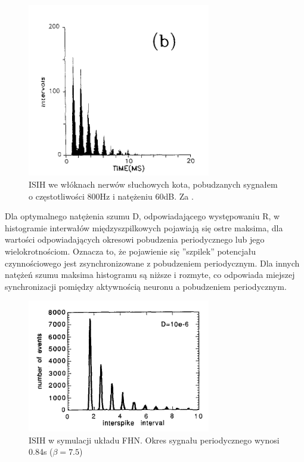   \begin{figure}
    \includegraphics[width=80mm]{images/longtin_fig1b.png}
    \caption{ISIH we włóknach nerwów słuchowych kota, pobudzanych sygnałem o częstotliwości 800Hz i natężeniu 60dB. Za \cite{longtin}.}
    \label{fig:graphics:longtin1b}
  \end{figure}

  Dla optymalnego natężenia szumu D, odpowiadającego występowaniu R, w histogramie interwałów międzyszpilkowych pojawiają się ostre maksima, dla wartości odpowiadających okresowi pobudzenia periodycznego lub jego wielokrotnościom. Oznacza to, że pojawienie się ''szpilek'' potencjału czynnościowego jest zsynchronizowane z pobudzeniem periodycznym. Dla innych natężeń szumu maksima histogramu są niższe i rozmyte, co odpowiada miejszej synchronizacji pomiędzy aktywnością neuronu a pobudzeniem periodycznym.


  \begin{figure}
    \includegraphics[width=80mm]{images/longtin_fig5a.png}
    \caption{ISIH w symulacji układu FHN. Okres sygnału periodycznego wynosi 0.84s ($\beta = 7.5$)}
    \label{fig:graphics:longtin5a}
  \end{figure}  


